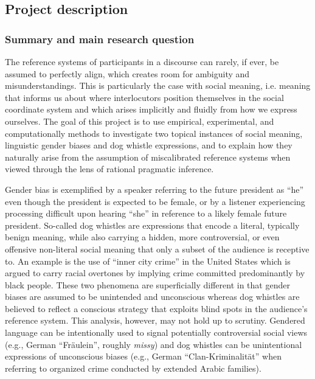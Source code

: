 \documentclass[11pt]{article}
\begin{document}
\subsection{Project description}


\subsubsection{Summary and main research question}

The reference systems of participants in a discourse can rarely, if ever, be assumed to perfectly align, which creates room for ambiguity and misunderstandings.  This is particularly the case with social meaning, i.e. meaning that informs us about where interlocutors position themselves in the social coordinate system and which arises implicitly and fluidly from how we express ourselves.  The goal of this project is to use empirical, experimental, and computationally methods to investigate two topical instances of social meaning, linguistic gender biases and dog whistle expressions, and to explain how they naturally arise from the assumption of miscalibrated reference systems when viewed through the lens of rational pragmatic inference.

Gender bias is exemplified by a speaker referring to the future president as “he” even though the president is expected to be female, or by a listener experiencing processing difficult upon hearing “she” in reference to a likely female future president.  So-called dog whistles are expressions that encode a literal, typically benign meaning, while also carrying a hidden, more controversial, or even offensive non-literal social meaning that only a subset of the audience is receptive to.  An example is the use of “inner city crime” in the United States which is argued to carry racial overtones by implying crime committed predominantly by black people.  These two phenomena are superficially different in that gender biases are assumed to be unintended and unconscious whereas dog whistles are believed to reflect a conscious strategy that exploits blind spots in the audience’s reference system.  This analysis, however, may not hold up to scrutiny.  Gendered language can be intentionally used to signal potentially controversial social views (e.g., German “Fräulein”, roughly \textit{missy}) and dog whistles can be unintentional expressions of unconscious biases (e.g., German “Clan-Kriminalität” when referring to organized crime conducted by extended Arabic families).
\end{document}
